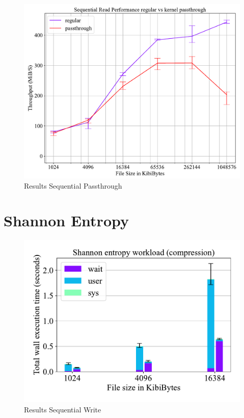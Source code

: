 \begin{figure}
    \centering
	\includegraphics[width=1\textwidth]{resources/images/results-passthrough.pdf}
	\caption{Results Sequential Passthrough}
    \label{figure:moduledependencies}
\end{figure}



\section{Shannon Entropy}

\begin{figure}
    \centering
	\includegraphics[width=1\textwidth]{resources/images/results-shannon-lower.pdf}
	\caption{Results Sequential Write}
    \label{figure:moduledependencies}
\end{figure}

